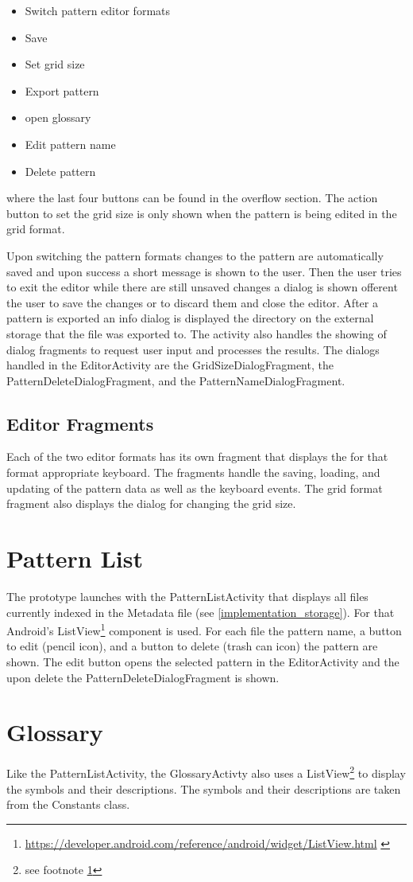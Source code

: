 \begin{itemize}
\item Switch pattern editor formats
\item Save
\item Set grid size
\item Export pattern
\item open glossary
\item Edit pattern name
\item Delete pattern
\end{itemize}

where the last four buttons can be found in the overflow section. The action button to set the grid size is only shown when the pattern is being edited in the grid format.

Upon switching the pattern formats changes to the pattern are automatically saved and upon success a short message is shown to the user. Then the user tries to exit the editor while there are still unsaved changes a dialog is shown offerent the user to save the changes or to discard them and close the editor. After a pattern is exported an info dialog is displayed the directory on the external storage that the file was exported to.
The activity also handles the showing of dialog fragments to request user input and processes the results. The dialogs handled in the EditorActivity are the GridSizeDialogFragment, the PatternDeleteDialogFragment, and the PatternNameDialogFragment.

\subsection{Editor Fragments}
Each of the two editor formats has its own fragment that displays the for that format appropriate keyboard. The fragments handle the saving, loading, and updating of the pattern data as well as the keyboard events. The grid format fragment also displays the dialog for changing the grid size.

\section{Pattern List}
The prototype launches with the PatternListActivity that displays all files currently indexed in the Metadata file (see \ref{implementation_storage}). For that Android's ListView\footnote{\url{https://developer.android.com/reference/android/widget/ListView.html} \label{url_footnote}} component is used. For each file the pattern name, a button to edit (pencil icon), and a button to delete (trash can icon) the pattern are shown. The edit button opens the selected pattern in the EditorActivity and the upon delete the PatternDeleteDialogFragment is shown.

\section{Glossary}
Like the PatternListActivity, the GlossaryActivty also uses a ListView\footnote{see footnote \ref{url_footnote}} to display the symbols and their descriptions. The symbols and their descriptions are taken from the Constants class.